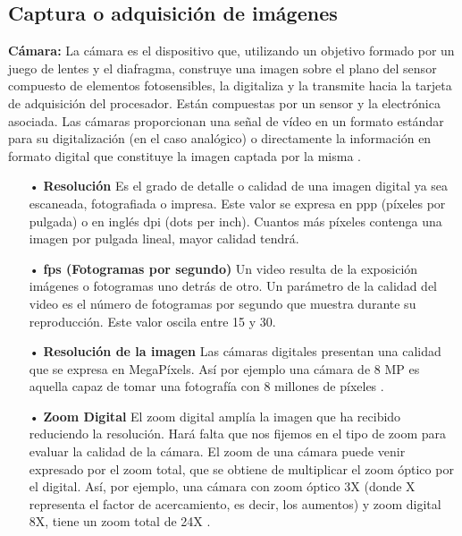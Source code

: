 \subsection{Captura o adquisición de imágenes}
{\bf Cámara:} \vskip 0.1cm
La cámara es el dispositivo que, utilizando un objetivo formado por un juego de lentes y el diafragma, construye una imagen sobre el plano del sensor compuesto de elementos fotosensibles, la digitaliza y la transmite hacia la tarjeta de adquisición del procesador. Están compuestas por un sensor y la electrónica asociada. Las cámaras proporcionan una señal de vídeo en un formato estándar para su digitalización (en el caso analógico) o directamente la información en formato digital que constituye la imagen captada por la misma \citep{Enrique}.
\vskip 0.1cm


\begin{itemize}
\item[•] {\bf Resolución} \vskip 0.1cm
Es el grado de detalle o calidad de una imagen digital ya sea escaneada, fotografiada o impresa. Este valor se expresa en ppp (píxeles por pulgada) o en inglés dpi (dots per inch). Cuantos más píxeles contenga una imagen por pulgada lineal, mayor calidad tendrá.
\vskip 0.1cm


\item[•] {\bf fps (Fotogramas por segundo)} \vskip 0.1cm
Un video resulta de la exposición imágenes o fotogramas uno detrás de otro. Un parámetro de la calidad del video es el número de fotogramas por segundo que muestra durante su reproducción. Este valor oscila entre 15 y 30.
\vskip 0.1cm

\item[•] {\bf Resolución de la imagen} \vskip 0.1cm
Las cámaras digitales presentan una calidad que se expresa en MegaPíxels. Así por ejemplo una cámara de 8 MP es aquella capaz de tomar una fotografía con 8 millones de píxeles \citep{Web}. 
\vskip 0.1cm


\item[•] {\bf Zoom Digital} \vskip 0.1cm
El zoom digital amplía la imagen que ha recibido reduciendo la resolución. Hará falta que nos fijemos en el tipo de zoom para evaluar la calidad de la cámara. El zoom de una cámara puede venir expresado por el zoom total, que se obtiene de multiplicar el zoom óptico por el digital. Así, por ejemplo, una cámara con zoom óptico 3X (donde X representa el factor de acercamiento, es decir, los aumentos) y zoom digital 8X, tiene un zoom total de 24X \cite{Foto}.
\vskip 0.1cm
\end{itemize}

